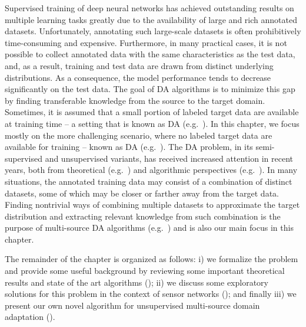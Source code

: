 Supervised training of deep neural networks has achieved outstanding results on multiple learning tasks greatly due to the availability of large and rich annotated datasets. Unfortunately, annotating such large-scale datasets is often prohibitively time-consuming and expensive. Furthermore, in many practical cases, it is not possible to collect annotated data with the same characteristics as the test data, and, as a result, training and test data are drawn from distinct underlying distributions. As a consequence, the model performance tends to decrease significantly on the test data. The goal of DA algorithms is to minimize this gap by finding transferable knowledge from the source to the target domain. Sometimes, it is assumed that a small portion of labeled target data are available at training time -- a setting that is known as  DA (e.g.\ \citet{Daume2010, Donahue2013, Kumar2010, Saito2019, Yao2015}). In this chapter, we focus mostly on the more challenging scenario, where no labeled target data are available for training -- known as  DA (e.g.\ \citet{Baktashmotlagh2013, Ganin2015, Kang2019, Long2016a, Zhao2018}). The DA problem, in its semi-supervised and unsupervised variants, has received increased attention in recent years, both from theoretical (e.g.\ \citet{BenDavid2010, BenDavid2007, Blitzer2008, Cortes2014, Gopalan2013, Hoffman2018, Zhao2019}) and algorithmic perspectives (e.g.\ \citet{Ajakan2014, Becker2013, Fernando2013, Jhuo2012, Long2015, Louizos2015, Sun2016, Tzeng2017}). In many situations, the annotated training data may consist of a combination of distinct datasets, some of which may be closer or farther away from the target data. Finding nontrivial ways of combining multiple datasets to approximate the target distribution and extracting relevant knowledge from such combination is the purpose of multi-source DA algorithms (e.g.\ \citet{Kim2017, Guo2018, Hoffman2018, Mansour2009, Sebag2019, Zhang2015, Zhao2018}) and is also our main focus in this chapter.

The remainder of the chapter is organized as follows: i) we formalize the problem and provide some useful background by reviewing some important theoretical results and state of the art algorithms (); ii) we discuss some exploratory solutions for this problem in the context of sensor networks (); and finally iii) we present our own novel algorithm for unsupervised multi-source domain adaptation ().

